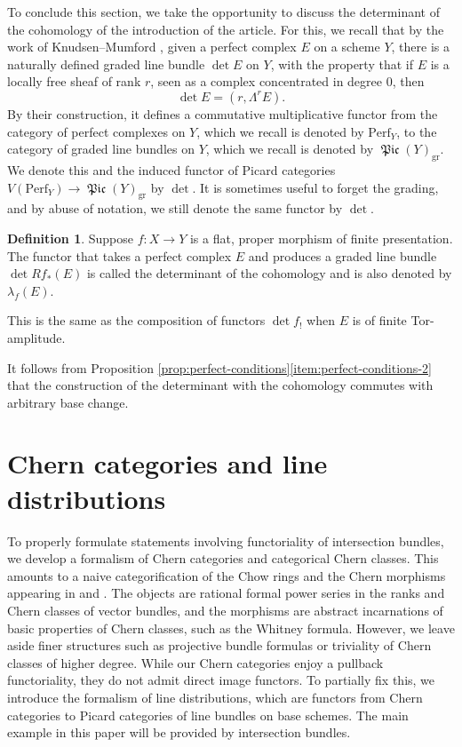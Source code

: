 \documentclass[JEP,XML,SOM,Unicode,published]{cedram}
\theoremstyle{plain}
\theoremstyle{definition}
\newtheorem{definition}[theorem]{Definition}
\DeclareMathOperator{\Picfr}{\mathfrak{Pic}}
\begin{document}
To conclude this section, we take the opportunity to discuss the determinant of the cohomology of the introduction of the article. For this, we recall that by the work of Knudsen--Mumford \cite{KnudsenMumford}, given a perfect complex $E$ on a scheme $Y$, there is a naturally defined graded line bundle $\det E$ on $Y$, with the property that if $E$ is a locally free sheaf of rank $r$, seen as a complex concentrated in degree 0, then
\begin{displaymath}
\det E = (r, \Lambda^{r} E).
\end{displaymath}
By their construction, it defines a commutative multiplicative functor from the category of perfect complexes on $Y$, which we recall is denoted by $\mathrm{Perf}_{Y}$, to the category of graded line bundles on $Y$, which we recall is denoted by $\Picfr(Y)_{\mathrm{gr}}$. We denote this and the induced functor of Picard categories $V(\mathrm{Perf}_{Y}) \to \Picfr(Y)_{\mathrm{gr}}$ by $\det$. It is sometimes useful to forget the grading, and by abuse of notation, we still denote the same functor by $\det$.

\begin{definition}\label{def:detcoh}
Suppose $f: X \to Y$ is a flat, proper morphism of finite presentation. The functor that takes a perfect complex $E$ and produces a graded line bundle $\det Rf_{\ast} (E)$ is called the determinant of the cohomology and is also denoted by $\lambda_{f}(E)$.

This is the same as the composition of functors $\det f_!$ when $E$ is of finite Tor-amplitude.
\end{definition}

It follows from Proposition \ref{prop:perfect-conditions}\eqref{item:perfect-conditions-2} that the construction of the determinant with the cohomology commutes with arbitrary base change.

\section{Chern categories and line distributions}\label{subsection:Chern-categories}

To properly formulate statements involving functoriality of intersection bundles, we develop a formalism of Chern categories and categorical Chern classes. This amounts to a naive categorification of the Chow rings and the Chern morphisms appearing in \cite{SGA6} and \cite{FultonLang}. The objects are rational formal power series in the ranks and Chern classes of vector bundles, and the morphisms are abstract incarnations of basic properties of Chern classes, such as the Whitney formula. However, we leave aside finer structures such as projective bundle formulas or triviality of Chern classes of higher degree. While our Chern categories enjoy a pullback functoriality, they do not admit direct image functors. To partially fix this, we introduce the formalism of line distributions, which are functors from Chern categories to Picard categories of line bundles on base schemes. The main example in this paper will be provided by intersection bundles.
\end{document}
